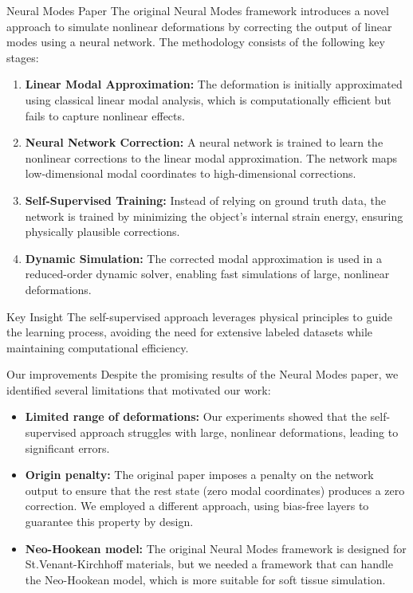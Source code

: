 \documentclass{beamer}
\begin{document}
\begin{frame}[allowframebreaks]{Neural Modes Paper}
    The original Neural Modes framework \cite{Wang_Du_Coros_Thomaszewski_2024} introduces a novel approach to simulate nonlinear deformations by correcting the output of linear modes using a neural network. The methodology consists of the following key stages:
    
    \begin{enumerate}
        \item \textbf{Linear Modal Approximation:} The deformation is initially approximated using classical linear modal analysis, which is computationally efficient but fails to capture nonlinear effects.
        \vspace{1em}
        \item \textbf{Neural Network Correction:} A neural network is trained to learn the nonlinear corrections to the linear modal approximation. The network maps low-dimensional modal coordinates to high-dimensional corrections.
        \vspace{1em}
        \item \textbf{Self-Supervised Training:} Instead of relying on ground truth data, the network is trained by minimizing the object's internal strain energy, ensuring physically plausible corrections.
        \vspace{1em}
        \item \textbf{Dynamic Simulation:} The corrected modal approximation is used in a reduced-order dynamic solver, enabling fast simulations of large, nonlinear deformations.
    \end{enumerate}
    
    \begin{alertblock}{Key Insight}
        The self-supervised approach leverages physical principles to guide the learning process, avoiding the need for extensive labeled datasets while maintaining computational efficiency.
    \end{alertblock}
\end{frame}

\begin{frame}{Our improvements}
    Despite the promising results of the Neural Modes paper, we identified several limitations that motivated our work:
    \begin{itemize}
        \item \textbf{Limited range of deformations:} Our experiments showed that the self-supervised approach struggles with large, nonlinear deformations, leading to significant errors.
        \item \textbf{Origin penalty:} The original paper imposes a penalty on the network output to ensure that the rest state (zero modal coordinates) produces a zero correction. We employed a different approach, using bias-free layers to guarantee this property by design.
        \item \textbf{Neo-Hookean model:} The original Neural Modes framework is designed for St.Venant-Kirchhoff materials, but we needed a framework that can handle the Neo-Hookean model, which is more suitable for soft tissue simulation.
        \end{itemize}    
\end{frame}
\end{document}
